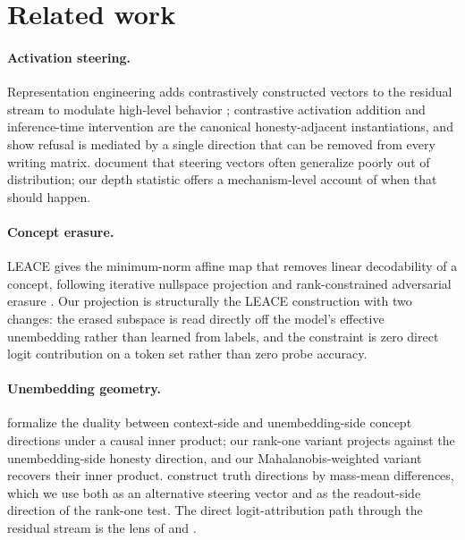 \section{Related work}\label{sec:related}

\paragraph{Activation steering.}
Representation engineering adds contrastively constructed vectors to the residual stream to modulate high-level behavior \citep{zou2023repe}; contrastive activation addition \citep{rimsky2024caa} and inference-time intervention \citep{li2023iti} are the canonical honesty-adjacent instantiations, and \citet{arditi2024refusal} show refusal is mediated by a single direction that can be removed from every writing matrix. \citet{tan2024analysing} document that steering vectors often generalize poorly out of distribution; our depth statistic offers a mechanism-level account of when that should happen.

\paragraph{Concept erasure.}
LEACE \citep{belrose2023leace} gives the minimum-norm affine map that removes linear decodability of a concept, following iterative nullspace projection \citep{ravfogel2020inlp} and rank-constrained adversarial erasure \citep{ravfogel2022rlace}. Our projection is structurally the LEACE construction with two changes: the erased subspace is read directly off the model's effective unembedding rather than learned from labels, and the constraint is zero direct logit contribution on a token set rather than zero probe accuracy.

\paragraph{Unembedding geometry.}
\citet{park2024linear} formalize the duality between context-side and unembedding-side concept directions under a causal inner product; our rank-one variant projects against the unembedding-side honesty direction, and our Mahalanobis-weighted variant recovers their inner product. \citet{marks2024geometry} construct truth directions by mass-mean differences, which we use both as an alternative steering vector and as the readout-side direction of the rank-one test. The direct logit-attribution path through the residual stream is the lens of \citet{elhage2021mathematical} and \citet{nostalgebraist2020logitlens}.

